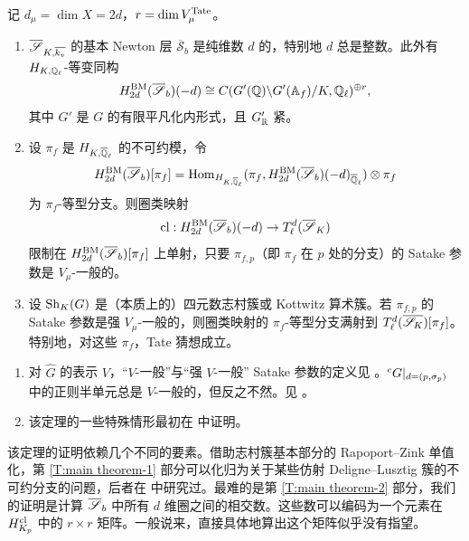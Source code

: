 \begin{thm}
\label{T:main theorem}
记 $d_{\mu}=\dim X=2d$，$r=\dim V_\mu^{{\operatorname{Tate}}}$。
\begin{enumerate}
\item\label{T:main theorem-1} $\overline{{\mathscr S}}_{K,\overline{k_v}}$ 的基本 Newton 层 $\overline{\mathscr S}_b$ 是纯维数 $d$ 的，特别地 $d$ 总是整数。此外有 $H_{K,{\mathbb Q}_\ell}$-等变同构
\[
H^{\operatorname{BM}}_{2d}(\overline{\mathscr S}_{b})(-d)\cong C(G'({\mathbb Q})\backslash G'({\mathbb A}_f)/K,{\mathbb Q}_\ell)^{\oplus r},
\]
其中 $G'$ 是 $G$ 的有限平凡化内形式，且 $G'_{\mathbb R}$ 紧。
\item\label{T:main theorem-2} 设 $\pi_f$ 是 $H_{K,{\overline{{\mathbb Q}}_\ell}}$ 的不可约模，令
\[
H^{\operatorname{BM}}_{2d}(\overline{\mathscr S}_{b})[\pi_f]={\operatorname{Hom}}_{H_{K,{\overline{{\mathbb Q}}_\ell}}}(\pi_f,H^{\operatorname{BM}}_{2d}(\overline{\mathscr S}_{b})(-d)_{{\overline{{\mathbb Q}}_\ell}})\otimes \pi_f
\]
为 $\pi_f$-等型分支。则圈类映射
\[
{\operatorname{cl}}:H^{\operatorname{BM}}_{2d}(\overline{\mathscr S}_{b})(-d)\to T^d_\ell(\overline{\mathscr S}_{K})
\]
限制在 $H^{\operatorname{BM}}_{2d}(\overline{\mathscr S}_{b})[\pi_f]$ 上单射，只要 $\pi_{f,p}$（即 $\pi_f$ 在 $p$ 处的分支）的 Satake 参数是 $V_\mu$-一般的。
\item\label{T:main theorem-3} 设 ${\operatorname{Sh}}_K(G)$ 是（本质上的）四元数志村簇或 Kottwitz 算术簇。若 $\pi_{f,p}$ 的 Satake 参数是强 $V_\mu$-一般的，则圈类映射的 $\pi_f$-等型分支满射到 $T^d_\ell(\overline{{\mathscr S}_K})[\pi_f]$。特别地，对这些 $\pi_f$，Tate 猜想成立。
\end{enumerate}
\end{thm}

\begin{rmk}
\begin{enumerate}
\item 对 $\hat G$ 的表示 $V$，“$V$-一般”与“强 $V$-一般” Satake 参数的定义见 \cite[Definition 1.4.2]{Xiao-Zhu-Cycle}。${}^cG|_{d=(p,\sigma_p)}$ 中的正则半单元总是 $V$-一般的，但反之不然。见 \cite[Remark 1.4.3]{Xiao-Zhu-Cycle}。
\item 该定理的一些特殊情形最初在 \cite{Helm-Tian-Xiao,Tian-Xiao-Tate} 中证明。
\end{enumerate}
\end{rmk}

该定理的证明依赖几个不同的要素。借助志村簇基本部分的 Rapoport--Zink 单值化，第 \eqref{T:main theorem-1} 部分可以化归为关于某些仿射 Deligne--Lusztig 簇的不可约分支的问题，后者在 \cite[\S 3]{Xiao-Zhu-Cycle} 中研究过。最难的是第 \eqref{T:main theorem-2} 部分，我们的证明是计算 $\overline{{\mathscr S}}_b$ 中所有 $d$ 维圈之间的相交数。这些数可以编码为一个元素在 $H^{{\operatorname{cl}}}_{K_p}$ 中的 $r\times r$ 矩阵。一般说来，直接具体地算出这个矩阵似乎没有指望。

